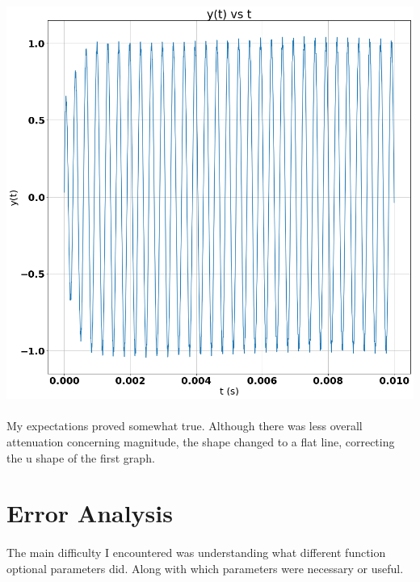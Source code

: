 \documentclass[12pt]{report}
\begin{document}
    \includegraphics[scale=0.25]{Figure 2022-03-29 221910 (4).png}
    
    \paragraph{} My expectations proved somewhat true. Although there was less overall attenuation concerning magnitude, the shape changed to a flat line, correcting the u shape of the first graph. 

\section{Error Analysis}


\paragraph{} The main difficulty I encountered was understanding what different function optional parameters did. Along with which parameters were necessary or useful.   
\end{document}
